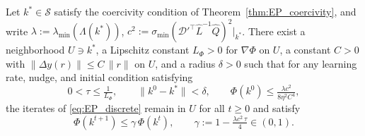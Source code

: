 \documentclass{siamart}
\begin{document}
\begin{theorem}\label{thm:discrete_EP}
Let $k^* \in \mathcal{S}$ satisfy the coercivity condition of Theorem~\ref{thm:EP_coercivity}, and write $\lambda := \lambda_{\min}(\Lambda(k^*))$, $c^2 := \sigma_{\min}(\mathscr{D}'^\top \hat{L}^{-1}\hat{Q})^2\big|_{k^*}$. There exist a neighborhood $U \ni k^*$, a Lipschitz constant $L_\Phi > 0$ for $\nabla\Phi$ on $U$, a constant $C > 0$ with $\|\Delta y(r)\| \le C\,\|r\|$ on $U$, and a radius $\delta > 0$ such that for any learning rate, nudge, and initial condition satisfying
\[
0 < \tau \le \tfrac{1}{L_\Phi}, \qquad \|k^0 - k^*\| < \delta, \qquad \Phi(k^0) \le \tfrac{\lambda c^2}{8\eta^2 C^4},
\]
the iterates of \eqref{eq:EP_discrete} remain in $U$ for all $t \ge 0$ and satisfy
\[
\Phi(k^{t+1}) \le \gamma\,\Phi(k^t), \qquad \gamma := 1 - \tfrac{\lambda c^2\,\tau}{4} \in (0,1).
\]
\end{theorem}
\end{document}
